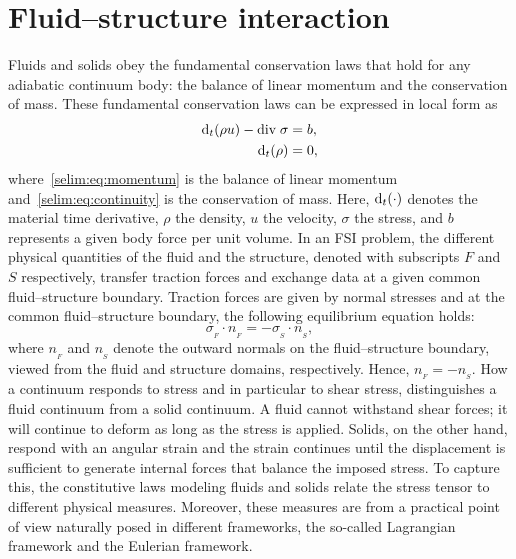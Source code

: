 \section{Fluid--structure interaction}
\label{selim:sec:fsi}

Fluids and solids obey the fundamental conservation laws that hold
for any adiabatic continuum body: the balance of linear momentum and
the conservation of mass.  These fundamental conservation laws can be
expressed in local form as
\begin{align}
\label{selim:eq:momentum}
\textrm{d}_t(\rho u) - \textrm{div}\; \sigma &= b,
\\
\label{selim:eq:continuity}
\textrm{d}_t(\rho )  &= 0,
\end{align}
where~\eqref{selim:eq:momentum} is the balance of linear momentum
and~\eqref{selim:eq:continuity} is the conservation of mass.  Here,
$\textrm{d}_t(\cdot)$ denotes the material time derivative, $\rho$ the density,
$u$ the velocity, $\sigma$ the stress, and $b$ represents a given body
force per unit volume. In an FSI problem, the different physical
quantities of the fluid and the structure, denoted with subscripts
$F$ and $S$ respectively, transfer traction forces and exchange data
at a given common fluid--structure boundary.  Traction forces are
given by normal stresses and at the common fluid--structure boundary,
the following equilibrium equation holds:
\begin{equation}
\label{selim:eq:traction}
\sigma_{_{F}}\cdot n_{_{F}} =  - \sigma_{_{S}}\cdot n_{_{S}},
\end{equation}
where $n_{_{F}}$ and $n_{_{S}}$ denote the outward normals on the
fluid--structure boundary, viewed from the fluid and structure
domains, respectively. Hence, $n_{_{F}} = - n_{_{S}}$.  How a continuum
responds to stress and in particular to shear stress, distinguishes a
fluid continuum from a solid continuum. A fluid cannot withstand shear
forces; it will continue to deform as long as the stress is
applied. Solids, on the other hand, respond with an angular strain and
the strain continues until the displacement is sufficient to generate
internal forces that balance the imposed stress. To capture this, the
constitutive laws modeling fluids and solids relate the stress tensor
to different physical measures. Moreover, these measures are from a
practical point of view naturally posed in different frameworks, the
so-called Lagrangian framework and the Eulerian framework.

